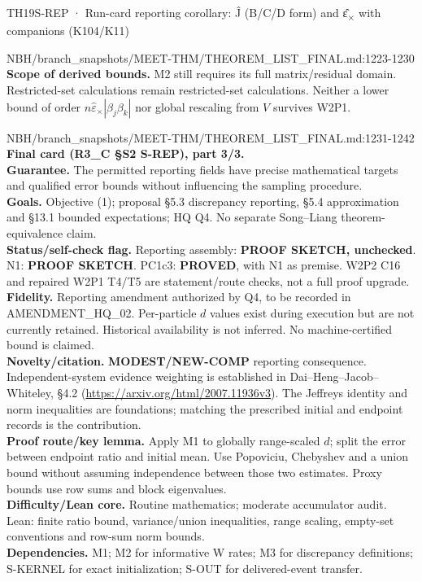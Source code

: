 \begin{card}{TH19}{S-REP · Run-card reporting corollary: Ĵ (B/C/D form) and ε̂\textsubscript{×} with companions (K104/K11)}
\begin{stmt}{NBH/branch_snapshots/MEET-THM/THEOREM_LIST_FINAL.md:1223-1230}
\textbf{Scope of derived bounds.} M2 still requires its full matrix/residual domain. Restricted-set calculations remain restricted-set calculations. Neither a lower bound of order $n\widehat\varepsilon_\times|\beta_j\beta_k|$ nor global rescaling from $V$ survives W2P1.
\end{stmt}

\begin{stmt}{NBH/branch_snapshots/MEET-THM/THEOREM_LIST_FINAL.md:1231-1242}
\textbf{Final card (R3\_C §S2 S-REP), part 3/3.}\\
\textbf{Guarantee.} The permitted reporting fields have precise mathematical targets and qualified error bounds without influencing the sampling procedure.\\
\textbf{Goals.} Objective (1); proposal §5.3 discrepancy reporting, §5.4 approximation and §13.1 bounded expectations; HQ Q4. No separate Song–Liang theorem-equivalence claim.\\
\textbf{Status/self-check flag.} Reporting assembly: \textbf{PROOF SKETCH, unchecked}. N1: \textbf{PROOF SKETCH}. PC1c3: \textbf{PROVED}, with N1 as premise. W2P2 C16 and repaired W2P1 T4/T5 are statement/route checks, not a full proof upgrade.\\
\textbf{Fidelity.} Reporting amendment authorized by Q4, to be recorded in AMENDMENT\_HQ\_02. Per-particle $d$ values exist during execution but are not currently retained. Historical availability is not inferred. No machine-certified bound is claimed.\\
\textbf{Novelty/citation.} \textbf{MODEST/NEW-COMP} reporting consequence. Independent-system evidence weighting is established in Dai–Heng–Jacob–Whiteley, §4.2 (\url{https://arxiv.org/html/2007.11936v3}). The Jeffreys identity and norm inequalities are foundations; matching the prescribed initial and endpoint records is the contribution.\\
\textbf{Proof route/key lemma.} Apply M1 to globally range-scaled $d$; split the error between endpoint ratio and initial mean. Use Popoviciu, Chebyshev and a union bound without assuming independence between those two estimates. Proxy bounds use row sums and block eigenvalues.\\
\textbf{Difficulty/Lean core.} Routine mathematics; moderate accumulator audit. Lean: finite ratio bound, variance/union inequalities, range scaling, empty-set conventions and row-sum norm bounds.\\
\textbf{Dependencies.} M1; M2 for informative W rates; M3 for discrepancy definitions; S-KERNEL for exact initialization; S-OUT for delivered-event transfer.\\

\end{stmt}
\end{card}
